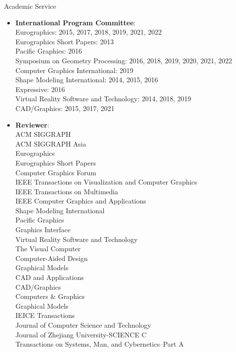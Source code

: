 {\Large\sc Academic Service}
\vspace{-3mm}
\begin{itemize}
\item {\bf International Program Committee}:\\
Eurographics: 2015, 2017, 2018, 2019, 2021, 2022\\
Eurographics Short Papers: 2013\\
Pacific Graphics: 2016\\
Symposium on Geometry Processing: 2016, 2018, 2019, 2020, 2021, 2022\\
Computer Graphics International: 2019\\
Shape Modeling International: 2014, 2015, 2016\\
Expressive: 2016\\
Virtual Reality Software and Technology: 2014, 2018, 2019\\
CAD/Graphics: 2015, 2017, 2021\\

\item {\bf Reviewer}:\\
ACM SIGGRAPH\\
ACM SIGGRAPH Asia\\
Eurographics\\
Eurographics Short Papers\\
Computer Graphics Forum\\
IEEE Transactions on Visualization and Computer Graphics\\
IEEE Transactions on Multimedia\\
IEEE Computer Graphics and Applications\\
Shape Modeling International\\
Pacific Graphics\\
Graphics Interface\\
Virtual Reality Software and Technology\\
The Visual Computer\\
Computer-Aided Design\\
Graphical Models\\
CAD and Applications\\
CAD/Graphics\\
Computers \& Graphics\\
Graphical Models\\
IEICE Transactions\\
Journal of Computer Science and Technology\\
Journal of Zhejiang University-SCIENCE C\\
Transactions on Systems, Man, and Cybernetics--Part A
\end{itemize}
